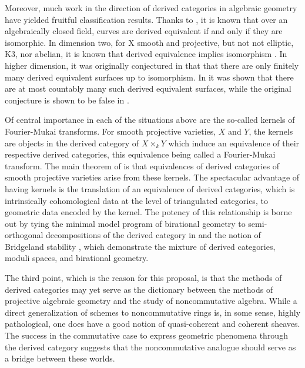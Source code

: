 \documentclass[11pt]{article}
\begin{document}
Moreover, much work in the direction of derived categories in algebraic geometry have yielded fruitful classification results.
Thanks to \cite{Orlov1997}, it is known that over an algebraically closed field, curves are derived equivalent if and only if they are isomorphic.
In dimension two, for X smooth and projective, but not not elliptic, K3, nor abelian, it is known that derived equivalence implies isomorphism \cite[Prop. 12.1]{HuyFMT}.
In higher dimension, it was originally conjectured in \cite{kawamata2002} that that there are only finitely many derived equivalent surfaces up to isomorphism.
In \cite{AnToe} it was shown that there are at most countably many such derived equivalent surfaces, while the original conjecture is shown to be false in \cite{lesieutre2014}.

Of central importance in each of the situations above are the so-called kernels of Fourier-Mukai transforms.
For smooth projective varieties, $X$ and $Y$, the kernels are objects in the derived category of $X \times_k Y$ which induce an equivalence of their respective derived categories, this equivalence being called a Fourier-Mukai transform.
The main theorem of \cite{Orlov1997} is that equivalences of derived categories of smooth projective varieties arise from these kernels.
The spectacular advantage of having kernels is the translation of an equivalence of derived categories, which is intrinsically cohomological data at the level of triangulated categories, to geometric data encoded by the kernel.
The potency of this relationship is borne out by tying the minimal model program of birational geometry to semi-orthogonal decompositions of the derived category in \cite{Bridgeland02,kawamata2002} and the notion of Bridgeland stability \cite{Bri07, ABCH13, BM14a, BM14b}, which demonstrate the mixture of derived categories, moduli spaces, and birational geometry.

The third point, which is the reason for this proposal, is that the methods of derived categories may yet serve as the dictionary between the methods of projective algebraic geometry and the study of noncommutative algebra.
While a direct generalization of schemes to noncommutative rings is, in some sense, highly pathological, one does have a good notion of quasi-coherent and coherent sheaves.
The success in the commutative case to express geometric phenomena through the derived category suggests that the noncommutative analogue should serve as a bridge between these worlds.
\end{document}
